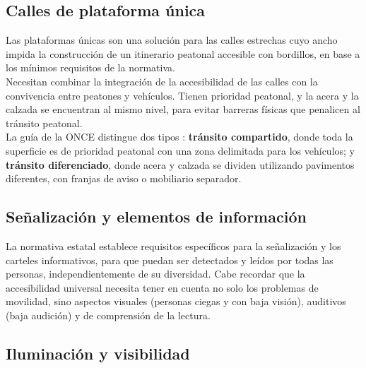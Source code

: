 \subsection{Calles de plataforma única}
\label{subsec:plataforma}

Las plataformas únicas son una solución para las calles estrechas cuyo ancho impida la construcción de un itinerario peatonal accesible con bordillos, en base a los mínimos requisitos de la normativa.
\\

Necesitan combinar la integración de la accesibilidad de las calles con la convivencia entre peatones y vehículos. Tienen prioridad peatonal, y la acera y la calzada se encuentran al mismo nivel, para evitar barreras físicas que penalicen al tránsito peatonal.
\\

La guía de la ONCE distingue dos tipos \parencite{once_2024}: \textbf{tránsito compartido}, donde toda la superficie es de prioridad peatonal con una zona delimitada para los vehículos; y \textbf{tránsito diferenciado}, donde acera y calzada se dividen utilizando pavimentos diferentes, con franjas de aviso o mobiliario separador.
\\

\subsection{Señalización y elementos de información}
\label{subsec:senalizacion}

La normativa estatal establece requisitos específicos para la señalización y los carteles informativos, para que puedan ser detectados y leídos por todas las personas, independientemente de su diversidad. Cabe recordar que la accesibilidad universal necesita tener en cuenta no solo los problemas de movilidad, sino aspectos visuales (personas ciegas y con baja visión), auditivos (baja audición) y de comprensión de la lectura.
\\

\subsection{Iluminación y visibilidad}
\label{subsec:iluminacion}

